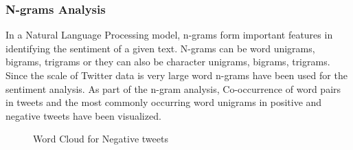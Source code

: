 \documentclass[9pt,twocolumn,twoside]{../../styles/osajnl}
\begin{document}
\subsubsection{N-grams Analysis}
In a Natural Language Processing model, n-grams form important features in identifying the sentiment of a  given text. N-grams can be word unigrams, bigrams, trigrams or they can also be character unigrams, bigrams, trigrams. Since the scale of Twitter data is very large word n-grams have been used for the sentiment analysis. As part of the n-gram analysis, Co-occurrence of word pairs in tweets and the most commonly occurring word unigrams in positive and negative tweets have been visualized. 
    \begin{figure}[htbp]
    \centering
    \caption{Word Cloud for Negative tweets}
    \label{fig:negwordcloud}
    \end{figure}
\end{document}
